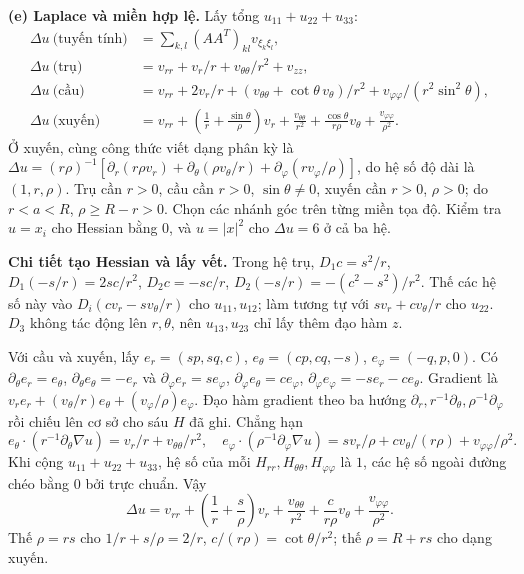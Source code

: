 \textbf{(e) Laplace và miền hợp lệ.} Lấy tổng $u_{11}+u_{22}+u_{33}$:
\begin{align*}
\Delta u\ \text{(tuyến tính)}&=\sum_{k,l}(AA^T)_{kl}v_{\xi_k\xi_l},\\
\Delta u\ \text{(trụ)}&=v_{rr}+v_r/r+v_{\theta\theta}/r^2+v_{zz},\\
\Delta u\ \text{(cầu)}&=v_{rr}+2v_r/r+(v_{\theta\theta}+\cot\theta\,v_\theta)/r^2+v_{\varphi\varphi}/(r^2\sin^2\theta),\\
\Delta u\ \text{(xuyến)}&=v_{rr}+\left(\frac1r+\frac{\sin\theta}{\rho}\right)v_r
+\frac{v_{\theta\theta}}{r^2}+\frac{\cos\theta}{r\rho}v_\theta+\frac{v_{\varphi\varphi}}{\rho^2}.
\end{align*}
Ở xuyến, cùng công thức viết dạng phân kỳ là $\Delta u=(r\rho)^{-1}[\partial_r(r\rho v_r)+\partial_\theta(\rho v_\theta/r)+\partial_\varphi(rv_\varphi/\rho)]$, do hệ số độ dài là $(1,r,\rho)$. Trụ cần $r>0$, cầu cần $r>0$, $\sin\theta\ne0$, xuyến cần $r>0$, $\rho>0$; do $r<a<R$, $\rho\ge R-r>0$. Chọn các nhánh góc trên từng miền tọa độ. Kiểm tra $u=x_i$ cho Hessian bằng $0$, và $u=|x|^2$ cho $\Delta u=6$ ở cả ba hệ.

\textbf{Chi tiết tạo Hessian và lấy vết.} Trong hệ trụ, $D_1c=s^2/r$, $D_1(-s/r)=2sc/r^2$, $D_2c=-sc/r$, $D_2(-s/r)=-(c^2-s^2)/r^2$. Thế các hệ số này vào $D_i(cv_r-sv_\theta/r)$ cho $u_{11},u_{12}$; làm tương tự với $sv_r+cv_\theta/r$ cho $u_{22}$. $D_3$ không tác động lên $r,\theta$, nên $u_{13},u_{23}$ chỉ lấy thêm đạo hàm $z$.

Với cầu và xuyến, lấy $e_r=(sp,sq,c)$, $e_\theta=(cp,cq,-s)$, $e_\varphi=(-q,p,0)$. Có $\partial_\theta e_r=e_\theta$, $\partial_\theta e_\theta=-e_r$ và $\partial_\varphi e_r=s e_\varphi$, $\partial_\varphi e_\theta=c e_\varphi$, $\partial_\varphi e_\varphi=-s e_r-c e_\theta$. Gradient là $v_re_r+(v_\theta/r)e_\theta+(v_\varphi/\rho)e_\varphi$. Đạo hàm gradient theo ba hướng $\partial_r,r^{-1}\partial_\theta,\rho^{-1}\partial_\varphi$ rồi chiếu lên cơ sở cho sáu $H$ đã ghi. Chẳng hạn
\[e_\theta\cdot(r^{-1}\partial_\theta\nabla u)=v_r/r+v_{\theta\theta}/r^2,\quad
e_\varphi\cdot(\rho^{-1}\partial_\varphi\nabla u)
=sv_r/\rho+cv_\theta/(r\rho)+v_{\varphi\varphi}/\rho^2.\]
Khi cộng $u_{11}+u_{22}+u_{33}$, hệ số của mỗi $H_{rr},H_{\theta\theta},H_{\varphi\varphi}$ là $1$, các hệ số ngoài đường chéo bằng $0$ bởi trực chuẩn. Vậy
\[\Delta u=v_{rr}+\left(\frac1r+\frac s\rho\right)v_r+
\frac{v_{\theta\theta}}{r^2}+\frac c{r\rho}v_\theta+\frac{v_{\varphi\varphi}}{\rho^2}.\]
Thế $\rho=rs$ cho $1/r+s/\rho=2/r$, $c/(r\rho)=\cot\theta/r^2$; thế $\rho=R+rs$ cho dạng xuyến.

